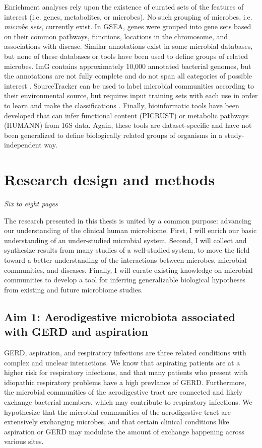 \documentclass[12pt]{article}
\begin{document}
Enrichment analyses rely upon the existence of curated sets of the features of interest (i.e. genes, metabolites, or microbes).
No such grouping of microbes, i.e. \textit{microbe sets}, currently exist. 
In GSEA, genes were grouped into gene sets based on their common 
pathways, functions, locations in the chromosome, and associations 
with disease. Similar annotations exist in some microbial databases, 
but none of these databases or tools have been used to define groups 
of related microbes. ImG contains approximately 10,000 annotated 
bacterial genomes, but the annotations are not fully complete and do 
not span all categories of possible interest \cite{markowitz-img-2013}. SourceTracker 
can be used to label microbial communities according to their 
environmental source, but requires input training sets with each use 
in order to learn and make the classifications \cite{knights-sourcetracker-2011}. 
Finally, bioinformatic tools have been developed that can infer functional 
content (PICRUST) \cite{langille-picrust-2013} or metabolic pathways 
(HUMANN) \cite{abubucker-humann-2012} from 16S data. Again, 
these tools are dataset-specific and have not been generalized to 
define biologically related groups of organisms in a study-independent way.

\section{Research design and methods}
\textit{Six to eight pages}

The research presented in this thesis is united by a common purpose: 
advancing our understanding of the clinical human microbiome.
First, I will enrich our basic understanding of an under-studied 
microbial system. Second, I will collect and synthesize 
results from many studies of a well-studied system, to move the 
field toward a better understanding of the interactions between 
microbes, microbial communities, and diseases. Finally, I will curate
existing knowledge on microbial communities to develop a tool for 
inferring generalizable biological hypotheses from existing and future microbiome studies.

\subsection{Aim 1: Aerodigestive microbiota associated with GERD and aspiration}

GERD, aspiration, and respiratory infections are three related
conditions with complex and unclear interactions.
We know that aspirating patients are at a higher risk for respiratory
infections, and that many patients who present with idiopathic
respiratory problems have a high prevlance of GERD. 
Furthermore, the microbial communities of the aerodigestive tract
are connected and likely exchange bacterial members, which may
contribute to respiratory infections. We hypothesize that the
microbial communities of the aerodigestive tract are extensively
exchanging microbes, and that certain clinical conditions like aspiration
or GERD may modulate the amount of exchange happening across various sites.
\end{document}
